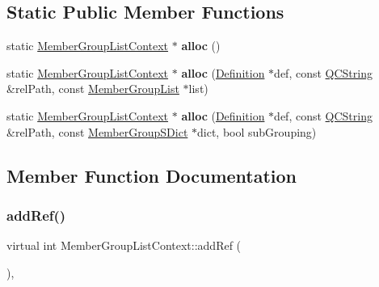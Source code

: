 \subsection*{Static Public Member Functions}
\begin{DoxyCompactItemize}
\item 
\mbox{\label{class_member_group_list_context_a2c4d323783a09aaee946fd6c6021a38e}} 
static \mbox{\hyperlink{class_member_group_list_context}{Member\+Group\+List\+Context}} $\ast$ {\bfseries alloc} ()
\item 
\mbox{\label{class_member_group_list_context_a5d2c89b1944fae7306081ddc8e1ca494}} 
static \mbox{\hyperlink{class_member_group_list_context}{Member\+Group\+List\+Context}} $\ast$ {\bfseries alloc} (\mbox{\hyperlink{class_definition}{Definition}} $\ast$def, const \mbox{\hyperlink{class_q_c_string}{Q\+C\+String}} \&rel\+Path, const \mbox{\hyperlink{class_member_group_list}{Member\+Group\+List}} $\ast$list)
\item 
\mbox{\label{class_member_group_list_context_a96919aa31b59ab4bfe5932f1ca97bd1f}} 
static \mbox{\hyperlink{class_member_group_list_context}{Member\+Group\+List\+Context}} $\ast$ {\bfseries alloc} (\mbox{\hyperlink{class_definition}{Definition}} $\ast$def, const \mbox{\hyperlink{class_q_c_string}{Q\+C\+String}} \&rel\+Path, const \mbox{\hyperlink{class_member_group_s_dict}{Member\+Group\+S\+Dict}} $\ast$dict, bool sub\+Grouping)
\end{DoxyCompactItemize}


\subsection{Member Function Documentation}
\mbox{\label{class_member_group_list_context_a3a135dbacc0e65f809b61797db5dbc4a}} 
\subsubsection{\texorpdfstring{addRef()}{addRef()}}
{\footnotesize\ttfamily virtual int Member\+Group\+List\+Context\+::add\+Ref (\begin{DoxyParamCaption}{ }\end{DoxyParamCaption})\hspace{0.3cm}{\ttfamily [inline]}, {\ttfamily [virtual]}}

